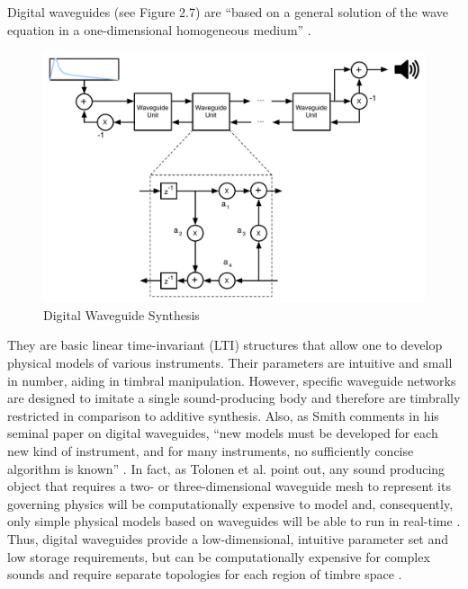 \documentclass[12pt]{report} 	%
\numberwithin{figure}{chapter}
\numberwithin{table}{chapter}
\numberwithin{equation}{chapter}
\begin{document}
\begin{flushleft}
Digital waveguides (see Figure 2.7) are ``based on a general solution of the wave equation in a one-dimensional homogeneous medium'' \cite[p. 63]{Tolonen:1998bh}. 
\begin{figure}[h!]
\begin{center}
\includegraphics[scale=0.55]{DigitalWaveguideSynthesis}
\caption[Digital waveguide synthesis]{Digital Waveguide Synthesis}
\end{center}
\end{figure}
They are basic linear time-invariant (LTI) structures that allow one to develop physical models of various instruments. Their parameters are intuitive and small in number, aiding in timbral manipulation. However, specific waveguide networks are designed to imitate a single sound-producing body and therefore are timbrally restricted in comparison to additive synthesis. Also, as Smith comments in his seminal paper on digital waveguides, ``new models must be developed for each new kind of instrument, and for many instruments, no sufficiently concise algorithm is known'' \cite[p. 86]{III:1992zn}. In fact, as Tolonen et al. point out, any sound producing object that requires a two- or three-dimensional waveguide mesh to represent its governing physics will be computationally expensive to model and, consequently, only simple physical models based on waveguides will be able to run in real-time \cite[p. 99-100]{Tolonen:1998bh}. Thus, digital waveguides provide a low-dimensional, intuitive parameter set and low storage requirements, but can be computationally expensive for complex sounds and require separate topologies for each region of timbre space \cite[p. 50]{Nicol:2005rp}.


\end{flushleft}
\end{document}
